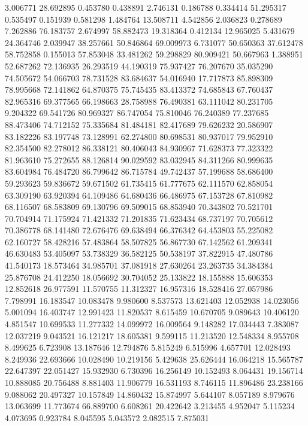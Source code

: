 3.006771
28.692895
0.453780
0.438891
2.746131
0.186788
0.334414
51.295317
0.535497
0.151939
0.581298
1.484764
13.508711
4.542856
2.036823
0.278689
7.262886
76.183757
2.674997
58.882473
19.318364
0.412134
12.965025
5.431679
24.364746
2.039947
38.257661
50.846864
69.009973
6.731077
50.650363
37.612478
58.752858
0.155013
57.853048
33.481262
59.298829
80.909421
50.667963
1.388951
52.687262
72.136935
26.293519
44.190319
75.937427
76.207670
35.035290
74.505672
54.066703
78.731528
83.684637
54.016940
17.717873
85.898309
78.995668
72.141862
64.870375
75.745435
83.413372
74.685843
67.760437
82.965316
69.377565
66.198663
28.758988
76.490381
63.111042
80.231705
9.204322
69.541726
80.969327
86.747054
75.810046
76.240389
77.237685
88.473406
74.712152
75.335684
81.484181
82.417689
79.626232
20.586907
83.182226
83.197748
73.128991
62.274800
80.698531
80.937017
79.952910
82.354500
82.278012
86.338121
80.406043
84.930967
71.628373
77.323322
81.963610
75.272655
88.126814
90.029592
83.032945
84.311266
80.999635
83.604984
76.484720
86.799642
86.715784
49.742437
57.199688
58.686400
59.293623
59.836672
59.671502
61.735415
61.777675
62.111570
62.858054
63.309190
63.920394
64.109486
64.680436
66.486975
67.153728
67.810982
68.116507
68.583809
69.130796
69.509015
68.853940
70.343802
70.521701
70.704914
71.175924
71.421332
71.201835
71.623434
68.737197
70.705612
70.386778
68.141480
72.676476
69.638494
66.376342
64.453803
55.225082
62.160727
58.428216
57.483864
58.507825
56.867730
67.142562
61.209341
46.630483
53.405097
53.738329
36.582125
50.538197
37.822915
47.480786
41.540173
18.573464
34.985701
37.081918
27.630264
23.263735
34.384384
25.876708
24.412250
18.056692
30.704052
25.133822
18.155888
15.606353
12.852618
26.977591
11.570755
11.312327
16.957316
18.528416
27.057986
7.798991
16.183547
10.083478
9.980600
8.537573
13.621403
12.052938
14.023056
5.001094
16.403747
12.991423
11.820537
8.615459
10.670705
9.089643
10.406120
4.851547
10.699533
11.277332
14.099972
16.009564
9.148282
17.034443
7.383087
12.037219
9.043521
16.121217
18.605381
9.599115
11.213520
12.548334
8.955708
8.499625
6.723908
13.187646
12.794876
5.815249
6.515996
4.657701
12.028493
8.249936
22.693666
10.028490
10.219156
5.429638
25.626444
16.064218
15.565787
22.647397
22.051427
15.932930
6.730396
16.256149
10.152493
8.064431
19.156714
10.888085
20.756488
8.881403
11.906779
16.531193
8.746115
11.896486
23.238166
9.088062
20.497327
10.157849
14.860432
15.874997
5.644107
8.057189
8.979676
13.063699
11.773674
66.889700
6.608261
20.422642
3.213455
4.952047
5.115234
4.073695
0.923784
8.045595
5.043572
2.082515
7.875031
